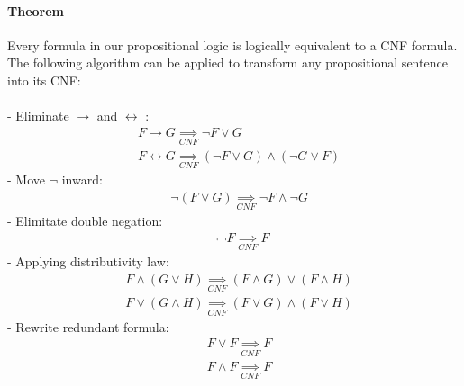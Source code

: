 \documentclass[part1.tex]{subfiles}
\begin{document}
\paragraph{Theorem} Every formula in our propositional logic is logically equivalent to a CNF
formula.\\
The following algorithm can be applied to transform any
propositional sentence into its CNF:\\\\
\indent- Eliminate \(\to\) and \(\leftrightarrow\) :
\begin{align*}
	&F \to G \underset{CNF}{\implies} \neg F \vee G\\
	&F \leftrightarrow G \underset{CNF}{\implies} (\neg F \vee G) \wedge (\neg G \vee F)
\end{align*}
\indent- Move \(\neg\) inward: 
\begin{align*}
	&\neg (F \vee G) \underset{CNF}{\implies} \neg F \wedge \neg G
\end{align*}
\indent- Elimitate double negation:
\begin{align*}
	&\neg \neg F \underset{CNF}{\implies} F
\end{align*}
\indent- Applying distributivity law:
\begin{align*}
	&F \wedge (G \vee H) \underset{CNF}{\implies} (F \wedge G) \vee (F \wedge H)\\
	&F \vee (G \wedge H) \underset{CNF}{\implies} (F \vee G) \wedge (F \vee H)
\end{align*}	
\indent- Rewrite redundant formula:
\begin{align*}	
	&F \vee F \underset{CNF}{\implies} F\\
	&F \wedge F \underset{CNF}{\implies} F
\end{align*}
\end{document}
